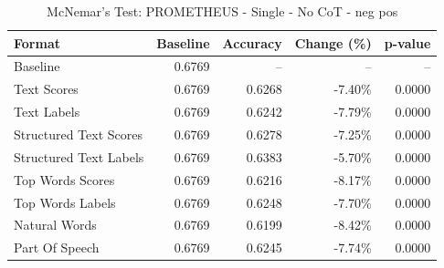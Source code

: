 \begin{table}[htbp]
\centering
\caption{McNemar's Test: PROMETHEUS - Single - No CoT - neg pos}
\label{tab:prometheus-single-no_chain_of_thought-neg_pos}
\begin{tabular}{lrrrr}
\toprule
Format & Baseline & Accuracy & Change (\%) & p-value \\
\midrule
Baseline & 0.6769 & -- & -- & -- \\
Text Scores & 0.6769 & 0.6268 & -7.40\% & 0.0000 \\
Text Labels & 0.6769 & 0.6242 & -7.79\% & 0.0000 \\
Structured Text Scores & 0.6769 & 0.6278 & -7.25\% & 0.0000 \\
Structured Text Labels & 0.6769 & 0.6383 & -5.70\% & 0.0000 \\
Top Words Scores & 0.6769 & 0.6216 & -8.17\% & 0.0000 \\
Top Words Labels & 0.6769 & 0.6248 & -7.70\% & 0.0000 \\
Natural Words & 0.6769 & 0.6199 & -8.42\% & 0.0000 \\
Part Of Speech & 0.6769 & 0.6245 & -7.74\% & 0.0000 \\
\bottomrule
\end{tabular}
\end{table}